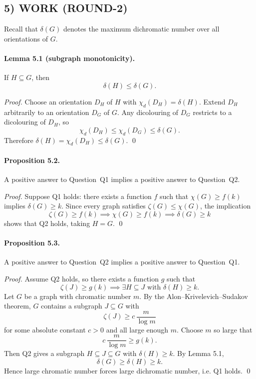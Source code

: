 \subsection*{5) WORK (ROUND-2)}
Recall that $\delta(G)$ denotes the maximum dichromatic number over all orientations of $G$.

\paragraph{Lemma 5.1 (subgraph monotonicity).}
If $H\subseteq G$, then
\[
\delta(H)\le \delta(G).
\]

\emph{Proof.}
Choose an orientation $D_H$ of $H$ with $\chi_d(D_H)=\delta(H)$. Extend $D_H$ arbitrarily to an orientation $D_G$ of $G$. Any dicolouring of $D_G$ restricts to a dicolouring of $D_H$, so
\[
\chi_d(D_H)\le \chi_d(D_G)\le \delta(G).
\]
Therefore $\delta(H)=\chi_d(D_H)\le \delta(G)$. \qed

\paragraph{Proposition 5.2.}
A positive answer to Question~Q1 implies a positive answer to Question~Q2.

\emph{Proof.}
Suppose Q1 holds: there exists a function $f$ such that $\chi(G)\ge f(k)$ implies $\delta(G)\ge k$. Since every graph satisfies $\zeta(G)\le \chi(G)$, the implication
\[
\zeta(G)\ge f(k)\implies \chi(G)\ge f(k)\implies \delta(G)\ge k
\]
shows that Q2 holds, taking $H=G$. \qed

\paragraph{Proposition 5.3.}
A positive answer to Question~Q2 implies a positive answer to Question~Q1.

\emph{Proof.}
Assume Q2 holds, so there exists a function $g$ such that
\[
\zeta(J)\ge g(k)\implies \exists H\subseteq J \text{ with } \delta(H)\ge k.
\]
Let $G$ be a graph with chromatic number $m$. By the Alon--Krivelevich--Sudakov theorem, $G$ contains a subgraph $J\subseteq G$ with
\[
\zeta(J)\ge c\,\frac{m}{\log m}
\]
for some absolute constant $c>0$ and all large enough $m$. Choose $m$ so large that
\[
c\,\frac{m}{\log m}\ge g(k).
\]
Then Q2 gives a subgraph $H\subseteq J\subseteq G$ with $\delta(H)\ge k$. By Lemma 5.1,
\[
\delta(G)\ge \delta(H)\ge k.
\]
Hence large chromatic number forces large dichromatic number, i.e. Q1 holds. \qed

